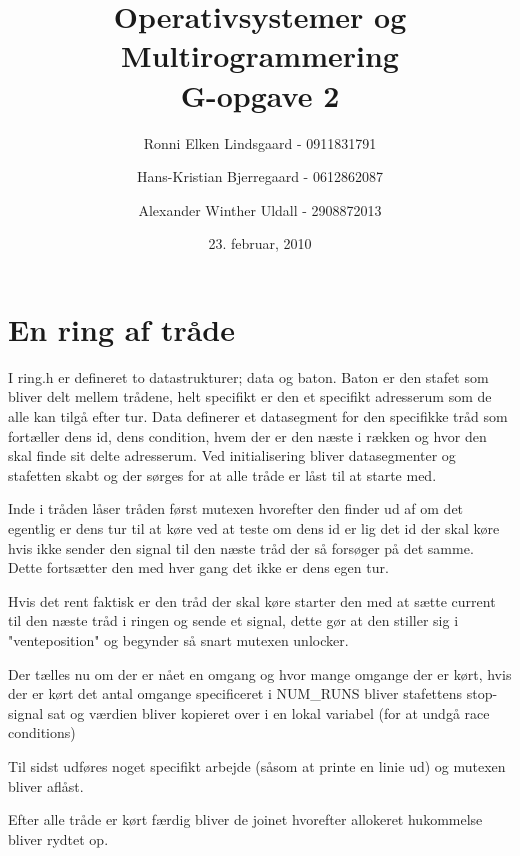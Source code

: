 \documentclass[titlepage]{article}
\title{Operativsystemer og Multirogrammering \\G-opgave 2}
\author{Ronni Elken Lindsgaard - 0911831791 \and
Hans-Kristian Bjerregaard - 0612862087 \and
Alexander Winther Uldall - 2908872013}
\date{23. februar, 2010}
\begin{document}
\maketitle
\newpage
\section{En ring af tråde}
I ring.h er defineret to datastrukturer; data og baton. Baton er den stafet som bliver delt mellem trådene, helt specifikt er den et specifikt adresserum som de alle kan tilgå efter tur.
Data definerer et datasegment for den specifikke tråd som fortæller dens id, dens condition, hvem der er den næste i rækken og hvor den skal finde sit delte adresserum.
Ved initialisering bliver datasegmenter og stafetten skabt og der sørges for at alle tråde er låst til at starte med.

Inde i tråden låser tråden først mutexen hvorefter den finder ud af om det egentlig er dens tur til at køre ved at teste om dens id er lig det id der skal køre hvis ikke sender den signal til den næste tråd der så forsøger på det samme. Dette fortsætter den med hver gang det ikke er dens egen tur.

Hvis det rent faktisk er den tråd der skal køre starter den med at sætte current til den næste tråd i ringen og sende et signal, dette gør at den stiller sig i "venteposition" og begynder så snart mutexen unlocker.

Der tælles nu om der er nået en omgang og hvor mange omgange der er kørt, hvis der er kørt det antal omgange specificeret i NUM\_RUNS bliver stafettens stop-signal sat og værdien bliver kopieret over i en lokal variabel (for at undgå race conditions)

Til sidst udføres noget specifikt arbejde (såsom at printe en linie ud) og mutexen bliver aflåst.

Efter alle tråde er kørt færdig bliver de joinet hvorefter allokeret hukommelse bliver rydtet op.
\end{document}
